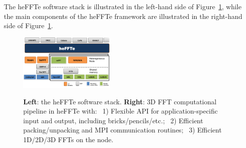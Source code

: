 The heFFTe software stack is illustrated in the left-hand side of Figure~\ref{fig:fft-ecp-pipeline}, 
while the main components of the heFFTe framework are illustrated in the right-hand side of
Figure~\ref{fig:fft-ecp-pipeline}. 
 
\begin{figure}[htb]
    \centering
    \includegraphics[width=0.42\textwidth]{projects/2.3.3-MathLibs/2.3.3.13-CLOVER/heffte}~~
    \caption{\label{fig:fft-ecp-pipeline}
    {\bf Left}: the heFFTe software stack. {\bf Right}: 3D FFT computational pipeline in heFFTe with:~
      1) Flexible API for application-specific input and output,
         including bricks/pencils/etc.;~
      2) Efficient packing/unpacking and MPI communication
         routines;~
      3) Efficient 1D/2D/3D FFTs on the node.}
\end{figure}

